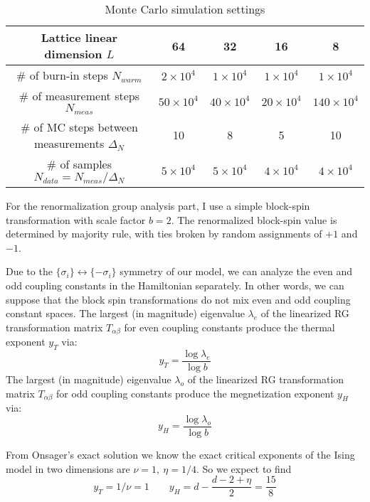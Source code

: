 \documentclass{article}
\begin{document}
\begin{table}[H]
\centering
\begin{tabular}{|c|c|c|c|c|} 
 \hline
 Lattice linear dimension $L$ & 64 & 32 & 16 & 8 \\ 
 \hline
 \# of burn-in steps $N_{warm}$ & $2\times 10^4$& $1\times 10^4$& $1\times 10^4$& $1\times 10^4$ \\ 
 \hline
 \# of measurement steps $N_{meas}$& $50\times 10^4$& $40\times 10^4$& $20\times 10^4$& $140\times 10^4$\\
 \hline
 \# of MC steps between measurements $\Delta_N$ & 10 & 8 & 5 & 10 \\
 \hline
 \# of samples $N_{data} = N_{meas}/\Delta_{N}$ & $5\times 10^4$& $5\times 10^4$& $4\times 10^4$& $4\times 10^4$ \\
 \hline
 \end{tabular}
 \caption{\label{MCSettings}Monte Carlo simulation settings}
\end{table}

For the renormalization group analysis part, I use a simple block-spin transformation with scale factor $b = 2$. The renormalized block-spin value is determined by majority rule, with ties broken by random assignments of $+1$ and $-1$.  


Due to the $\{\sigma_i\} \leftrightarrow \{-\sigma_i\}$ symmetry of our model, we can analyze the even and odd coupling constants in the Hamiltonian separately. In other words, we can suppose that the block spin transformations do not mix even and odd coupling constant spaces. The largest (in magnitude) eigenvalue $\lambda_e$ of the linearized RG transformation matrix $T_{\alpha\beta}$ for even coupling constants produce the thermal exponent $y_T$ via:
\begin{equation}
y_T = \frac{\log \lambda_e}{\log b}
\end{equation}
The largest (in magnitude) eigenvalue $\lambda_o$ of the linearized RG transformation matrix $T_{\alpha\beta}$ for odd coupling constants  produce the megnetization exponent $y_H$ via:
\begin{equation}
y_H = \frac{\log \lambda_o}{\log b}
\end{equation}

From Onsager's exact solution \cite{Onsager1944} we know the exact critical exponents of the Ising model in two dimensions are $\nu = 1 ,\  \eta = 1/4$. So we expect to find
\begin{equation*}
y_T = 1/\nu = 1 \qquad y_H = d-\frac{d-2+\eta}{2}= \frac{15}{8}
\end{equation*}
\end{document}

